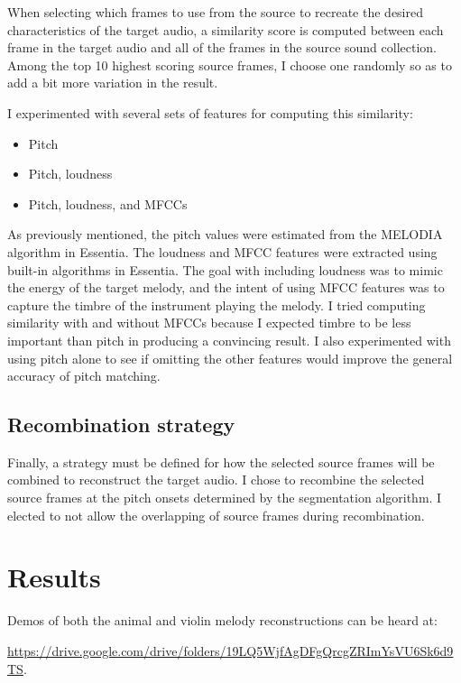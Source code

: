 \documentclass{article}
\begin{document}
When selecting which frames to use from the source to recreate the desired characteristics of the target audio, a similarity score is computed between each frame in the target audio and all of the frames in the source sound collection. Among the top 10 highest scoring source frames, I choose one randomly so as to add a bit more variation in the result.

I experimented with several sets of features for computing this similarity:

\begin{itemize}
  \item Pitch
  \item Pitch, loudness
  \item Pitch, loudness, and MFCCs
\end{itemize}

As previously mentioned, the pitch values were estimated from the MELODIA algorithm in Essentia. The loudness and MFCC features were extracted using built-in algorithms in Essentia. The goal with including loudness was to mimic the energy of the target melody, and the intent of using MFCC features was to capture the timbre of the instrument playing the melody. I tried computing similarity with and without MFCCs because I expected timbre to be less important than pitch in producing a convincing result. I also experimented with using pitch alone to see if omitting the other features would improve the general accuracy of pitch matching.

\subsection{Recombination strategy}

Finally, a strategy must be defined for how the selected source frames will be combined to reconstruct the target audio. I chose to recombine the selected source frames at the pitch onsets determined by the segmentation algorithm. I elected to not allow the overlapping of source frames during recombination.

\section{Results}

Demos of both the animal and violin melody reconstructions can be heard at:
	\begin{center}
		\url{https://drive.google.com/drive/folders/19LQ5WjfAgDFgQrcgZRImYsVU6Sk6d9TS}.
	\end{center}
\end{document}

